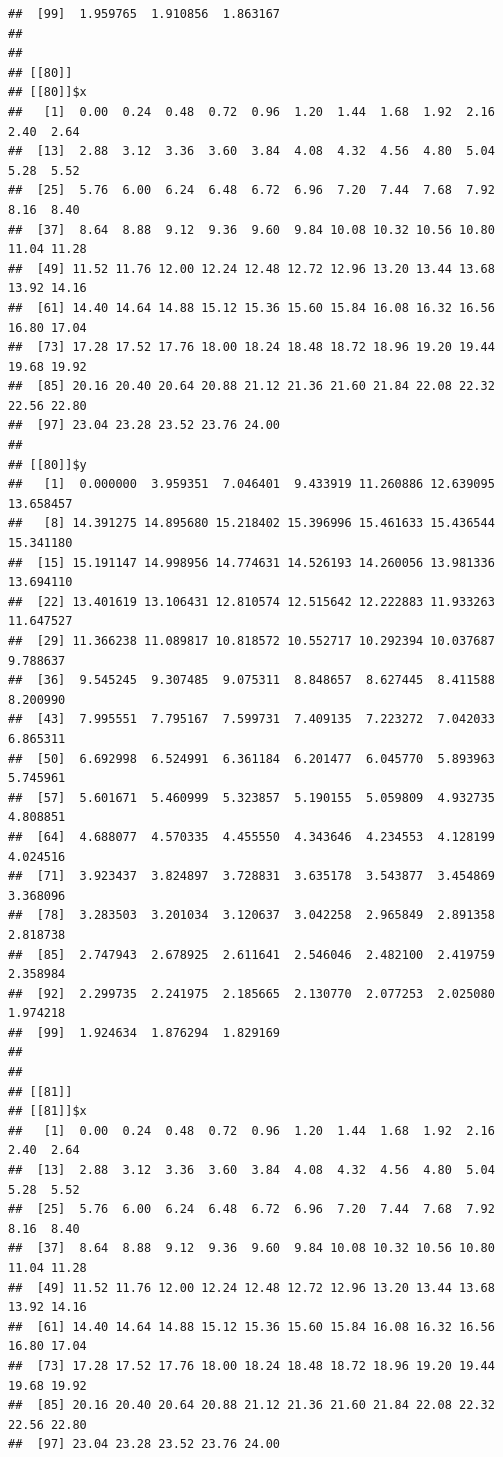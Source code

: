 \documentclass[
  ignorenonframetext,
]{beamer}
\begin{document}
\begin{frame}[fragile]{}
\begin{verbatim}
##  [99]  1.959765  1.910856  1.863167
## 
## 
## [[80]]
## [[80]]$x
##   [1]  0.00  0.24  0.48  0.72  0.96  1.20  1.44  1.68  1.92  2.16  2.40  2.64
##  [13]  2.88  3.12  3.36  3.60  3.84  4.08  4.32  4.56  4.80  5.04  5.28  5.52
##  [25]  5.76  6.00  6.24  6.48  6.72  6.96  7.20  7.44  7.68  7.92  8.16  8.40
##  [37]  8.64  8.88  9.12  9.36  9.60  9.84 10.08 10.32 10.56 10.80 11.04 11.28
##  [49] 11.52 11.76 12.00 12.24 12.48 12.72 12.96 13.20 13.44 13.68 13.92 14.16
##  [61] 14.40 14.64 14.88 15.12 15.36 15.60 15.84 16.08 16.32 16.56 16.80 17.04
##  [73] 17.28 17.52 17.76 18.00 18.24 18.48 18.72 18.96 19.20 19.44 19.68 19.92
##  [85] 20.16 20.40 20.64 20.88 21.12 21.36 21.60 21.84 22.08 22.32 22.56 22.80
##  [97] 23.04 23.28 23.52 23.76 24.00
## 
## [[80]]$y
##   [1]  0.000000  3.959351  7.046401  9.433919 11.260886 12.639095 13.658457
##   [8] 14.391275 14.895680 15.218402 15.396996 15.461633 15.436544 15.341180
##  [15] 15.191147 14.998956 14.774631 14.526193 14.260056 13.981336 13.694110
##  [22] 13.401619 13.106431 12.810574 12.515642 12.222883 11.933263 11.647527
##  [29] 11.366238 11.089817 10.818572 10.552717 10.292394 10.037687  9.788637
##  [36]  9.545245  9.307485  9.075311  8.848657  8.627445  8.411588  8.200990
##  [43]  7.995551  7.795167  7.599731  7.409135  7.223272  7.042033  6.865311
##  [50]  6.692998  6.524991  6.361184  6.201477  6.045770  5.893963  5.745961
##  [57]  5.601671  5.460999  5.323857  5.190155  5.059809  4.932735  4.808851
##  [64]  4.688077  4.570335  4.455550  4.343646  4.234553  4.128199  4.024516
##  [71]  3.923437  3.824897  3.728831  3.635178  3.543877  3.454869  3.368096
##  [78]  3.283503  3.201034  3.120637  3.042258  2.965849  2.891358  2.818738
##  [85]  2.747943  2.678925  2.611641  2.546046  2.482100  2.419759  2.358984
##  [92]  2.299735  2.241975  2.185665  2.130770  2.077253  2.025080  1.974218
##  [99]  1.924634  1.876294  1.829169
## 
## 
## [[81]]
## [[81]]$x
##   [1]  0.00  0.24  0.48  0.72  0.96  1.20  1.44  1.68  1.92  2.16  2.40  2.64
##  [13]  2.88  3.12  3.36  3.60  3.84  4.08  4.32  4.56  4.80  5.04  5.28  5.52
##  [25]  5.76  6.00  6.24  6.48  6.72  6.96  7.20  7.44  7.68  7.92  8.16  8.40
##  [37]  8.64  8.88  9.12  9.36  9.60  9.84 10.08 10.32 10.56 10.80 11.04 11.28
##  [49] 11.52 11.76 12.00 12.24 12.48 12.72 12.96 13.20 13.44 13.68 13.92 14.16
##  [61] 14.40 14.64 14.88 15.12 15.36 15.60 15.84 16.08 16.32 16.56 16.80 17.04
##  [73] 17.28 17.52 17.76 18.00 18.24 18.48 18.72 18.96 19.20 19.44 19.68 19.92
##  [85] 20.16 20.40 20.64 20.88 21.12 21.36 21.60 21.84 22.08 22.32 22.56 22.80
##  [97] 23.04 23.28 23.52 23.76 24.00

\end{verbatim}
\end{frame}
\end{document}
